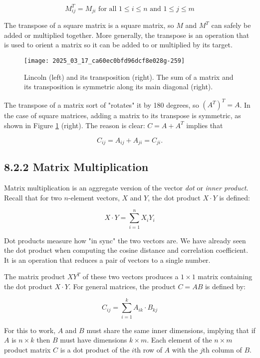 \documentclass[10pt]{article}
\begin{document}
\[ M^T_{ij} = M_{ji} \text{ for all } 1 \leq i \leq n \text{ and } 1 \leq j \leq m \]

The transpose of a square matrix is a square matrix, so $M$ and $M^T$ can safely be added or multiplied together. More generally, the transpose is an operation that is used to orient a matrix so it can be added to or multiplied by its target.

\begin{figure}[ht]
    \centering
    \texttt{[image: 2025\_03\_17\_ca60ec0bfd96dcf8e028g-259]}
    \caption{Lincoln (left) and its transposition (right). The sum of a matrix and its transposition is symmetric along its main diagonal (right).}
    \label{fig:lincoln_transpose}
\end{figure}

The transpose of a matrix sort of "rotates" it by 180 degrees, so $(A^T)^T = A$. In the case of square matrices, adding a matrix to its transpose is symmetric, as shown in Figure \ref{fig:lincoln_transpose} (right). The reason is clear: $C = A + A^T$ implies that

\[ C_{ij} = A_{ij} + A_{ji} = C_{ji}. \]

\subsection*{8.2.2 Matrix Multiplication}
Matrix multiplication is an aggregate version of the vector \textit{dot} or \textit{inner product}. Recall that for two $n$-element vectors, $X$ and $Y$, the dot product $X \cdot Y$ is defined:

\[ X \cdot Y = \sum_{i=1}^n X_i Y_i \]

Dot products measure how "in sync" the two vectors are. We have already seen the dot product when computing the cosine distance and correlation coefficient. It is an operation that reduces a pair of vectors to a single number.

The matrix product $X Y^T$ of these two vectors produces a $1 \times 1$ matrix containing the dot product $X \cdot Y$. For general matrices, the product $C = A B$ is defined by:

\[ C_{ij} = \sum_{i=1}^k A_{ik} \cdot B_{kj} \]

For this to work, $A$ and $B$ must share the same inner dimensions, implying that if $A$ is $n \times k$ then $B$ must have dimensions $k \times m$. Each element of the $n \times m$ product matrix $C$ is a dot product of the $i$th row of $A$ with the $j$th column of $B$.
\end{document}
